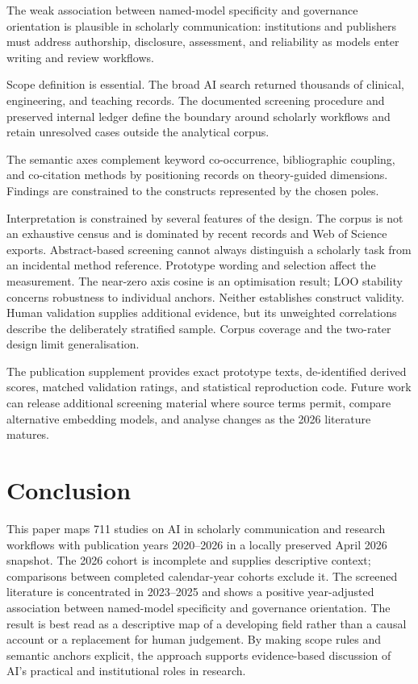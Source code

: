 \documentclass[a4paper,10pt,conference]{IEEEtran}
\begin{document}
The weak association between named-model specificity and governance orientation
is plausible in scholarly communication: institutions and publishers must
address authorship, disclosure, assessment, and reliability as models enter
writing and review workflows.

Scope definition is essential. The broad AI search returned thousands of
clinical, engineering, and teaching records. The documented screening procedure
and preserved internal ledger define the boundary around scholarly workflows
and retain unresolved cases outside the analytical corpus.

The semantic axes complement keyword co-occurrence, bibliographic coupling,
and co-citation methods by positioning records on theory-guided dimensions.
Findings are constrained to the constructs represented by the chosen poles.

Interpretation is constrained by several features of the design. The corpus is
not an exhaustive census and is dominated by recent records and Web of Science
exports. Abstract-based screening cannot always distinguish a scholarly task
from an incidental method reference.
Prototype wording and selection affect the measurement. The near-zero axis
cosine is an optimisation result; LOO stability concerns robustness to individual
anchors. Neither establishes construct validity. Human validation supplies
additional evidence, but its unweighted correlations describe the deliberately
stratified sample. Corpus coverage and the two-rater design limit generalisation.

The publication supplement provides exact prototype texts, de-identified
derived scores, matched validation ratings, and statistical reproduction code.
Future work can release additional screening material where source terms permit,
compare alternative embedding models, and analyse changes as the 2026 literature
matures.

\raggedbottom
\section{Conclusion}

This paper maps 711 studies on AI in scholarly communication and research
workflows with publication years 2020--2026 in a locally preserved April 2026
snapshot. The 2026 cohort is incomplete and supplies descriptive context;
comparisons between completed calendar-year cohorts exclude it.
The screened literature is concentrated in 2023--2025 and
shows a positive year-adjusted association between named-model specificity and
governance orientation. The result is best read as a descriptive map of
a developing field rather than a causal account or a replacement for human judgement.
By making scope rules and semantic anchors explicit, the approach supports
evidence-based discussion of AI's practical and institutional roles in research.
\end{document}
